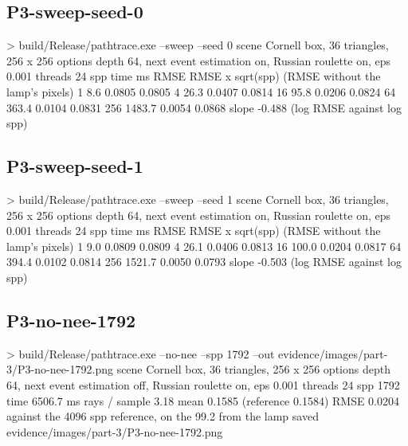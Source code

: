 \documentclass[11pt,a4paper]{article}
\begin{document}
\subsection*{P3-sweep-seed-0}
\begin{terminal}
> build/Release/pathtrace.exe --sweep --seed 0
  scene          Cornell box, 36 triangles, 256 x 256
  options        depth 64, next event estimation on, Russian roulette on, eps 0.001
  threads        24
     spp     time ms       RMSE RMSE x sqrt(spp)   (RMSE without the lamp's pixels)
       1         8.6     0.0805           0.0805
       4        26.3     0.0407           0.0814
      16        95.8     0.0206           0.0824
      64       363.4     0.0104           0.0831
     256      1483.7     0.0054           0.0868
  slope          -0.488  (log RMSE against log spp)
\end{terminal}
\subsection*{P3-sweep-seed-1}
\begin{terminal}
> build/Release/pathtrace.exe --sweep --seed 1
  scene          Cornell box, 36 triangles, 256 x 256
  options        depth 64, next event estimation on, Russian roulette on, eps 0.001
  threads        24
     spp     time ms       RMSE RMSE x sqrt(spp)   (RMSE without the lamp's pixels)
       1         9.0     0.0809           0.0809
       4        26.1     0.0406           0.0813
      16       100.0     0.0204           0.0817
      64       394.4     0.0102           0.0814
     256      1521.7     0.0050           0.0793
  slope          -0.503  (log RMSE against log spp)
\end{terminal}
\subsection*{P3-no-nee-1792}
\begin{terminal}
> build/Release/pathtrace.exe --no-nee --spp 1792 --out
evidence/images/part-3/P3-no-nee-1792.png
  scene          Cornell box, 36 triangles, 256 x 256
  options        depth 64, next event estimation off, Russian roulette on, eps 0.001
  threads        24
  spp            1792
  time           6506.7 ms
  rays / sample  3.18
  mean           0.1585  (reference 0.1584)
  RMSE           0.0204  against the 4096 spp reference, on the 99.2%
from the lamp
  saved          evidence/images/part-3/P3-no-nee-1792.png
\end{terminal}
\end{document}
